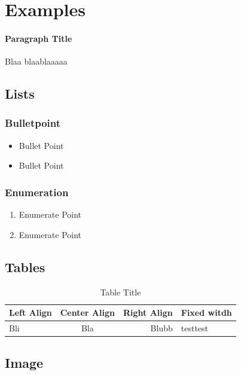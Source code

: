 \section{Examples}

\paragraph{Paragraph Title}
Blaa blaablaaaaa

\subsection{Lists}

\subsubsection{Bulletpoint}

\begin{itemize}
	\item Bullet Point
	\item Bullet Point
\end{itemize}

\subsubsection{Enumeration}
\begin{enumerate}
	\item Enumerate Point
	\item Enumerate Point
\end{enumerate}

\subsection{Tables}

\begin{table}[H]
	\begin{tabular}{l | c | r | p{}}
		\textbf{Left Align} & \textbf{Center Align} & \textbf{Right Align} & 
		\textbf{Fixed witdh}\\ \hline
		Bli & Bla & Blubb & testtest\\ 		
	\end{tabular}
	\caption{Table Title}
	\label{tab:Sample Table}
\end{table}

\subsection{Image}
